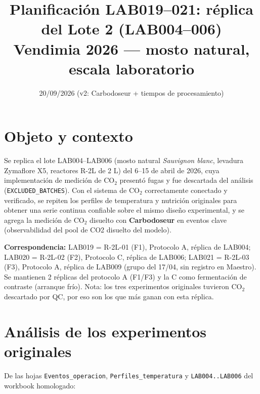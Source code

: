 \documentclass[10pt,landscape]{article}
\title{\textcolor{prim}{Planificación LAB019--021: réplica del Lote 2 (LAB004--006)}\\[2pt]\large Vendimia 2026 --- mosto natural, escala laboratorio}
\author{}
\date{20/09/2026 (v2: Carbodoseur + tiempos de procesamiento)}
\begin{document}
\maketitle
\thispagestyle{empty}
\vspace{-1.2cm}

\section{Objeto y contexto}
Se replica el lote LAB004--LAB006 (mosto natural \emph{Sauvignon blanc}, levadura Zymaflore X5, reactores R-2L de 2 L) del 6--15 de abril de 2026, cuya implementación de medición de CO$_2$ presentó fugas y fue descartada del análisis (\texttt{EXCLUDED\_BATCHES}). Con el sistema de CO$_2$ correctamente conectado y verificado, se repiten los perfiles de temperatura y nutrición originales para obtener una serie continua confiable sobre el mismo diseño experimental, y se agrega la medición de CO$_2$ disuelto con \textbf{Carbodoseur} en eventos clave (observabilidad del pool de CO2 disuelto del modelo).

\textbf{Correspondencia:} LAB019 = R-2L-01 (F1), Protocolo A, réplica de LAB004; LAB020 = R-2L-02 (F2), Protocolo C, réplica de LAB006; LAB021 = R-2L-03 (F3), Protocolo A, réplica de LAB009 (grupo del 17/04, sin registro en Maestro). Se mantienen 2 réplicas del protocolo A (F1/F3) y la C como fermentación de contraste (arranque frío). Nota: los tres experimentos originales tuvieron CO$_2$ descartado por QC, por eso son los que más ganan con esta réplica.

\section{Análisis de los experimentos originales}
De las hojas \texttt{Eventos\_operacion}, \texttt{Perfiles\_temperatura} y \texttt{LAB004..LAB006} del workbook homologado:
\end{document}
